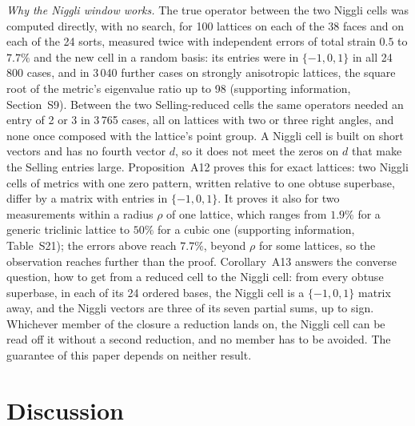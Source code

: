 \emph{Why the Niggli window works.} The true operator between the two Niggli cells was computed directly, with no search, for 100 lattices on each of the 38 faces and on each of the 24 sorts, measured twice with independent errors of total strain $0.5$ to $7.7\%$ and the new cell in a random basis: its entries were in $\{-1,0,1\}$ in all 24\,800 cases, and in 3\,040 further cases on strongly anisotropic lattices, the square root of the metric's eigenvalue ratio up to 98 (supporting information, Section~S9). Between the two Selling-reduced cells the same operators needed an entry of 2 or 3 in 3\,765 cases, all on lattices with two or three right angles, and none once composed with the lattice's point group. A Niggli cell is built on short vectors and has no fourth vector $d$, so it does not meet the zeros on $d$ that make the Selling entries large. Proposition~A12 proves this for exact lattices: two Niggli cells of metrics with one zero pattern, written relative to one obtuse superbase, differ by a matrix with entries in $\{-1,0,1\}$. It proves it also for two measurements within a radius $\rho$ of one lattice, which ranges from $1.9\%$ for a generic triclinic lattice to $50\%$ for a cubic one (supporting information, Table~S21); the errors above reach $7.7\%$, beyond $\rho$ for some lattices, so the observation reaches further than the proof. Corollary~A13 answers the converse question, how to get from a reduced cell to the Niggli cell: from every obtuse superbase, in each of its 24 ordered bases, the Niggli cell is a $\{-1,0,1\}$ matrix away, and the Niggli vectors are three of its seven partial sums, up to sign. Whichever member of the closure a reduction lands on, the Niggli cell can be read off it without a second reduction, and no member has to be avoided. The guarantee of this paper depends on neither result.

\section{Discussion}\label{sec:discussion}

